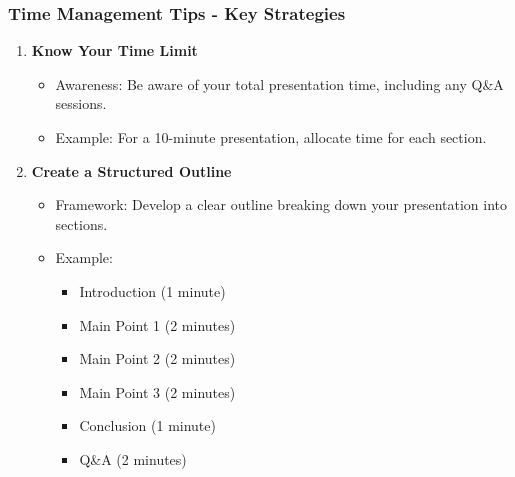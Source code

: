 \documentclass[aspectratio=169]{beamer}
\begin{document}
\begin{frame}[fragile]
    \frametitle{Time Management Tips - Key Strategies}
    \begin{enumerate}
        \item \textbf{Know Your Time Limit}
            \begin{itemize}
                \item Awareness: Be aware of your total presentation time, including any Q\&A sessions.
                \item Example: For a 10-minute presentation, allocate time for each section.
            \end{itemize}
        
        \item \textbf{Create a Structured Outline}
            \begin{itemize}
                \item Framework: Develop a clear outline breaking down your presentation into sections.
                \item Example: 
                \begin{itemize}
                    \item Introduction (1 minute)
                    \item Main Point 1 (2 minutes)
                    \item Main Point 2 (2 minutes)
                    \item Main Point 3 (2 minutes)
                    \item Conclusion (1 minute)
                    \item Q\&A (2 minutes)
                \end{itemize}
            \end{itemize}
    \end{enumerate}
\end{frame}
\end{document}
